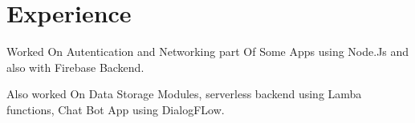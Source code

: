 \documentclass[]{deedy-resume-openfont}
\begin{document}
\hfill
\begin{minipage}[t]{0.66\textwidth} 


\section{Experience}
\sectionsep


\vspace{\topsep} %
\begin{tightemize}
\item Worked On Autentication and Networking part Of Some Apps using Node.Js and also with Firebase Backend.
\item Also worked On Data Storage Modules, serverless backend using Lamba functions, Chat Bot App using DialogFLow.
\end{tightemize}
\sectionsep





\end{minipage}
\end{document}
